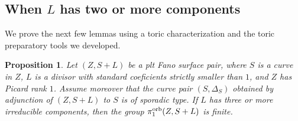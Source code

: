 \documentclass{amsart}
\newtheorem{proposition}[theorem]{Proposition}
\theoremstyle{definition}
\theoremstyle{remark}
\numberwithin{equation}{section}
\begin{document}

\subsection{When $L$ has two or more components}

We prove the next few lemmas using a toric characterization and the toric preparatory tools we developed.

\begin{proposition}\label{prop:toric-fund-group-3comps}
Let $(Z,S+L)$ be a plt Fano surface pair, where
$S$ is a curve in $Z$, $L$ is a divisor with standard coeficients strictly smaller than $1$, and $Z$ has Picard rank $1$. Assume moreover %
that the curve pair $(S,\Delta_S)$ obtained by adjunction of $(Z,S+L)$ to $S$ is of sporadic type.
If $L$ has three or more irreducible components, then the group $\pi_1^{\rm orb}(Z,S+L)$ is finite.
\end{proposition}
\end{document}

